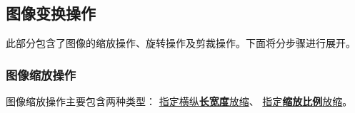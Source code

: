 \documentclass[11pt]{article}
\begin{document}
    \begin{center}
    \end{center}
    
    
    \subsection{图像变换操作}
    此部分包含了图像的缩放操作、旋转操作及剪裁操作。下面将分步骤进行展开。
    \subsubsection{图像缩放操作}
    图像缩放操作主要包含两种类型：
    	\underline{指定横纵\textbf{长宽度}放缩}、
    	\underline{指定\textbf{缩放比例}放缩}。
\end{document}
